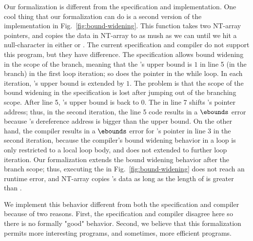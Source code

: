 Our formalization is different from the \checkedc specification and implementation.
One cool thing that our formalization can do is a second version of the  implementation in Fig.~\ref{fig:bound-widening}. 
This function takes two NT-array pointers, and copies the data in NT-array  to \code{\a} as mush as we can until we hit a null-character in either  or .
The current \checkedc specification and compiler do not support this program, but they have difference. 
The \checkedc specification allows bound widening in the scope of the  branch, meaning that the 's upper bound is $1$ in line 5 (in the  branch) in the first loop iteration; so does the pointer  in the while loop. In each iteration, 's upper bound is extended by $1$. The problem is that the scope of the bound widening in the specification is lost after jumping out of the branching scope. After line 5, 's upper bound is back to $0$. The  in line 7 shifts 's pointer address; thus, in the second iteration, the line 5 code results in a $\ebounds$ error because 's dereference address is bigger than the upper bound. 
On the other hand, the \checkedc compiler results in a $\ebounds$ error for 's pointer in line 3 in the second iteration, because the compiler's bound widening behavior in a  loop is only restricted to a local loop body, and does not extended to further loop iteration. 
Our formalization extends the bound widening behavior after the  branch scope; thus, executing the  in Fig.~\ref{fig:bound-widening} does not reach an runtime error, and NT-array  copies 's data as long as the length of  is greater than . 

We implement this behavior different from both the \checkedc specification and compiler because of two reasons. First, the \checkedc specification and compiler disagree here so there is no formally "good" behavior. Second, we believe that this formalization permits more interesting programs, and sometimes, more efficient programs. 

